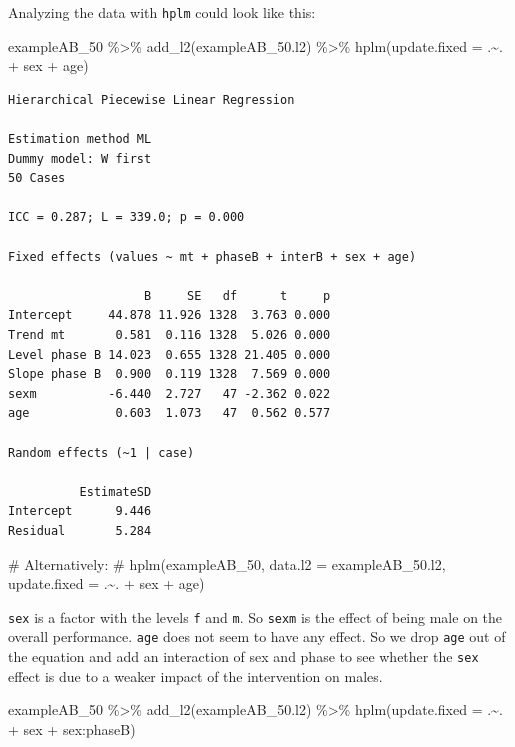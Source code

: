\documentclass[
  letterpaper,
  DIV=11,
  numbers=noendperiod]{scrreprt}
\newenvironment{Shaded}{\begin{snugshade}}{\end{snugshade}}
\newcommand{\AttributeTok}[1]{\textcolor[rgb]{0.40,0.45,0.13}{#1}}
\newcommand{\CommentTok}[1]{\textcolor[rgb]{0.37,0.37,0.37}{#1}}
\newcommand{\FunctionTok}[1]{\textcolor[rgb]{0.28,0.35,0.67}{#1}}
\newcommand{\NormalTok}[1]{\textcolor[rgb]{0.00,0.23,0.31}{#1}}
\newcommand{\SpecialCharTok}[1]{\textcolor[rgb]{0.37,0.37,0.37}{#1}}
\begin{document}
Analyzing the data with \texttt{hplm} could look like this:

\begin{Shaded}
\begin{Highlighting}[]
\NormalTok{exampleAB\_50 }\SpecialCharTok{\%\textgreater{}\%}
  \FunctionTok{add\_l2}\NormalTok{(exampleAB\_50.l2) }\SpecialCharTok{\%\textgreater{}\%}
  \FunctionTok{hplm}\NormalTok{(}\AttributeTok{update.fixed =}\NormalTok{ .}\SpecialCharTok{\textasciitilde{}}\NormalTok{. }\SpecialCharTok{+}\NormalTok{ sex }\SpecialCharTok{+}\NormalTok{ age)}
\end{Highlighting}
\end{Shaded}

\begin{verbatim}
Hierarchical Piecewise Linear Regression

Estimation method ML 
Dummy model: W first
50 Cases

ICC = 0.287; L = 339.0; p = 0.000

Fixed effects (values ~ mt + phaseB + interB + sex + age)

                   B     SE   df      t     p
Intercept     44.878 11.926 1328  3.763 0.000
Trend mt       0.581  0.116 1328  5.026 0.000
Level phase B 14.023  0.655 1328 21.405 0.000
Slope phase B  0.900  0.119 1328  7.569 0.000
sexm          -6.440  2.727   47 -2.362 0.022
age            0.603  1.073   47  0.562 0.577

Random effects (~1 | case)

          EstimateSD
Intercept      9.446
Residual       5.284
\end{verbatim}

\begin{Shaded}
\begin{Highlighting}[]
\CommentTok{\# Alternatively:}
\CommentTok{\# hplm(exampleAB\_50, data.l2 = exampleAB\_50.l2, update.fixed = .\textasciitilde{}. + sex + age)}
\end{Highlighting}
\end{Shaded}

\texttt{sex} is a factor with the levels \texttt{f} and \texttt{m}. So
\texttt{sexm} is the effect of being male on the overall performance.
\texttt{age} does not seem to have any effect. So we drop \texttt{age}
out of the equation and add an interaction of sex and phase to see
whether the \texttt{sex} effect is due to a weaker impact of the
intervention on males.

\begin{Shaded}
\begin{Highlighting}[]
\NormalTok{exampleAB\_50 }\SpecialCharTok{\%\textgreater{}\%}
  \FunctionTok{add\_l2}\NormalTok{(exampleAB\_50.l2) }\SpecialCharTok{\%\textgreater{}\%}
  \FunctionTok{hplm}\NormalTok{(}\AttributeTok{update.fixed =}\NormalTok{ .}\SpecialCharTok{\textasciitilde{}}\NormalTok{. }\SpecialCharTok{+}\NormalTok{ sex }\SpecialCharTok{+}\NormalTok{ sex}\SpecialCharTok{:}\NormalTok{phaseB)}
\end{Highlighting}
\end{Shaded}
\end{document}
